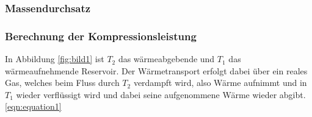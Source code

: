 \subsubsection {Massendurchsatz}
\label{sec:massendurchsatz}
\subsubsection {Berechnung der Kompressionsleistung}
\label{sec:kompressorleistung}


In Abbildung \ref{fig:bild1} ist $T_2$ das wärmeabgebende und $T_1$ das wärmeaufnehmende Reservoir. Der Wärmetransport erfolgt dabei über ein reales Gas, welches beim Fluss durch $T_2$ verdampft wird, also Wärme aufnimmt
und in $T_1$ wieder verflüssigt wird und dabei seine aufgenommene Wärme wieder abgibt. \eqref{eqn:equation1}







\cite{Anleitung}
